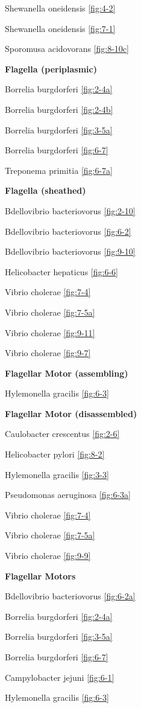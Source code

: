 \documentclass[]{tufte-book}
\begin{document}
Shewanella oneidensis \ref{fig:4-2}

Shewanella oneidensis \ref{fig:7-1}

Sporomusa acidovorans \ref{fig:8-10c}

\textbf{Flagella (periplasmic)}

Borrelia burgdorferi \ref{fig:2-4a}

Borrelia burgdorferi \ref{fig:2-4b}

Borrelia burgdorferi \ref{fig:3-5a}

Borrelia burgdorferi \ref{fig:6-7}

Treponema primitia \ref{fig:6-7a}

\textbf{Flagella (sheathed)}

Bdellovibrio bacteriovorus \ref{fig:2-10}

Bdellovibrio bacteriovorus \ref{fig:6-2}

Bdellovibrio bacteriovorus \ref{fig:9-10}

Helicobacter hepaticus \ref{fig:6-6}

Vibrio cholerae \ref{fig:7-4}

Vibrio cholerae \ref{fig:7-5a}

Vibrio cholerae \ref{fig:9-11}

Vibrio cholerae \ref{fig:9-7}

\textbf{Flagellar Motor (assembling)}

Hylemonella gracilis \ref{fig:6-3}

\textbf{Flagellar Motor (disassembled)}

Caulobacter crescentus \ref{fig:2-6}

Helicobacter pylori \ref{fig:8-2}

Hylemonella gracilis \ref{fig:3-3}

Pseudomonas aeruginosa \ref{fig:6-3a}

Vibrio cholerae \ref{fig:7-4}

Vibrio cholerae \ref{fig:7-5a}

Vibrio cholerae \ref{fig:9-9}

\textbf{Flagellar Motors}

Bdellovibrio bacteriovorus \ref{fig:6-2a}

Borrelia burgdorferi \ref{fig:2-4a}

Borrelia burgdorferi \ref{fig:3-5a}

Borrelia burgdorferi \ref{fig:6-7}

Campylobacter jejuni \ref{fig:6-1}

Hylemonella gracilis \ref{fig:6-3}
\end{document}

